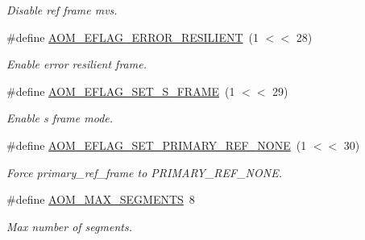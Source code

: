 \begin{DoxyCompactItemize}
\begin{DoxyCompactList}\small\item\em Disable ref frame mvs. \end{DoxyCompactList}\item 
\#define \hyperlink{group__aom__encoder_gaf8d13359c477e5787cf67b6e583317a0}{A\+O\+M\+\_\+\+E\+F\+L\+A\+G\+\_\+\+E\+R\+R\+O\+R\+\_\+\+R\+E\+S\+I\+L\+I\+E\+NT}~(1 $<$$<$ 28)
\begin{DoxyCompactList}\small\item\em Enable error resilient frame. \end{DoxyCompactList}\item 
\#define \hyperlink{group__aom__encoder_ga98480541d93f77481d44dfb0896fcdc5}{A\+O\+M\+\_\+\+E\+F\+L\+A\+G\+\_\+\+S\+E\+T\+\_\+\+S\+\_\+\+F\+R\+A\+ME}~(1 $<$$<$ 29)
\begin{DoxyCompactList}\small\item\em Enable s frame mode. \end{DoxyCompactList}\item 
\#define \hyperlink{group__aom__encoder_ga0f19205f8fb08e9d9aa49403428ff33b}{A\+O\+M\+\_\+\+E\+F\+L\+A\+G\+\_\+\+S\+E\+T\+\_\+\+P\+R\+I\+M\+A\+R\+Y\+\_\+\+R\+E\+F\+\_\+\+N\+O\+NE}~(1 $<$$<$ 30)
\begin{DoxyCompactList}\small\item\em Force primary\+\_\+ref\+\_\+frame to P\+R\+I\+M\+A\+R\+Y\+\_\+\+R\+E\+F\+\_\+\+N\+O\+NE. \end{DoxyCompactList}\item 
\#define \hyperlink{group__aom__encoder_ga58817629f5270c0db0851e354cd6e57c}{A\+O\+M\+\_\+\+M\+A\+X\+\_\+\+S\+E\+G\+M\+E\+N\+TS}~8
\begin{DoxyCompactList}\small\item\em Max number of segments. \end{DoxyCompactList}\end{DoxyCompactItemize}
